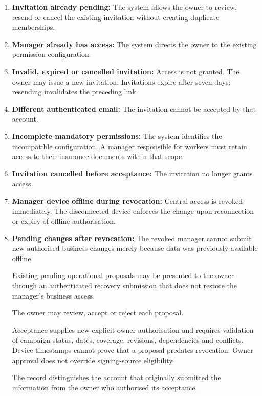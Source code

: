 \begin{enumerate}[label=A\arabic*.]
        \item \textbf{Invitation already pending:}
        The system allows the owner to review, resend
        or cancel the existing invitation without creating
        duplicate memberships.

        \item \textbf{Manager already has access:}
        The system directs the owner to the existing
        permission configuration.

        \item \textbf{Invalid, expired or cancelled invitation:}
        Access is not granted.
        The owner may issue a new invitation. Invitations expire after seven days; resending invalidates the preceding link.

        \item \textbf{Different authenticated email:}
        The invitation cannot be accepted by that account.

        \item \textbf{Incomplete mandatory permissions:}
        The system identifies the incompatible configuration.
        A manager responsible for workers must retain access
        to their insurance documents within that scope.

        \item \textbf{Invitation cancelled before acceptance:}
        The invitation no longer grants access.

        \item \textbf{Manager device offline during revocation:}
        Central access is revoked immediately.
        The disconnected device enforces the change upon
        reconnection or expiry of offline authorisation.

        \item \textbf{Pending changes after revocation:}
        The revoked manager cannot submit new authorised business
        changes merely because data was previously available offline.

        Existing pending operational proposals may be presented
        to the owner through an authenticated recovery submission
        that does not restore the manager's business access.

        The owner may review, accept or reject each proposal.

        Acceptance supplies new explicit owner authorisation and requires validation of campaign status, dates, coverage, revisions, dependencies and conflicts. Device timestamps cannot prove that a proposal predates revocation. Owner approval does not override signing-source eligibility.

        The record distinguishes the account that originally
        submitted the information from the owner who authorised
        its acceptance.
    \end{enumerate}


